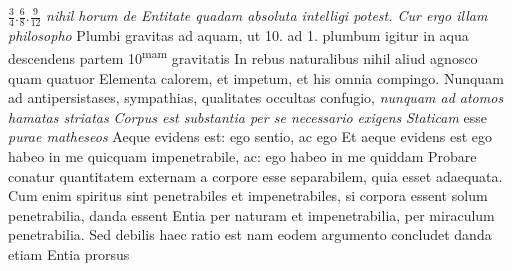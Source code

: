 \rule[-4mm]{0mm}{10mm}$\displaystyle\frac{3}{4}. \frac{6}{8}. \frac{9}{12}$
\textit{nihil horum de Entitate quadam absoluta intelligi potest. Cur ergo illam philosopho }
\pend 
\pstart {} Plumbi gravitas\protect{} ad aquam, ut 10. ad 1. plumbum\protect{} igitur in aqua descendens partem 10\textsuperscript{mam} gravitatis 
\pend
\pstart {} In rebus naturalibus nihil aliud agnosco quam quatuor Elementa calorem\protect{}, et impetum\protect{}, et his omnia compingo. Nunquam ad antipersistases, sympathias, qualitates occultas confugio,
\textit{nunquam ad atomos hamatas striatas }
\pend 
\pstart {} \textit{Corpus est substantia per se necessario exigens }\pend 
\pstart {}
\textit{Staticam} esse \textit{purae matheseos }
 Aeque evidens est: ego sentio, ac ego  Et aeque evidens est ego habeo in me quicquam impenetrabile, ac: ego habeo in me quiddam 
\pend 
\pstart {}  Probare conatur quantitatem externam a corpore esse separabilem, quia  esset adaequata. Cum enim spiritus sint penetrabiles\protect{} et impenetrabiles\protect{}, si corpora essent solum penetrabilia, danda essent Entia per naturam et impenetrabilia, per miraculum penetrabilia. Sed debilis haec ratio est nam eodem argumento concludet  danda etiam Entia prorsus 
